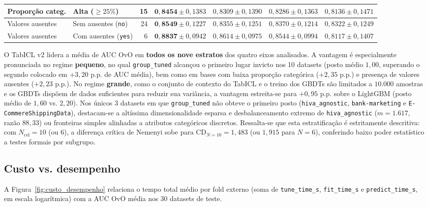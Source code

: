 \documentclass[11pt,a4paper]{article}
\begin{document}
\begin{table}[htbp]
{\begin{tabular}{@{}llrrrrr@{}}
        Proporção categ. & Alta ($\ge 25\%$) & 15 & $\mathbf{0{,}8454} \pm 0{,}1383$ & $0{,}8309 \pm 0{,}1390$ & $0{,}8286 \pm 0{,}1363$ & $0{,}8136 \pm 0{,}1471$ \\
        \midrule
        Valores ausentes & Sem ausentes (\texttt{no}) & 24 & $\mathbf{0{,}8549} \pm 0{,}1227$ & $0{,}8355 \pm 0{,}1251$ & $0{,}8370 \pm 0{,}1214$ & $0{,}8322 \pm 0{,}1249$ \\
        Valores ausentes & Com ausentes (\texttt{yes}) & 6 & $\mathbf{0{,}8837} \pm 0{,}0942$ & $0{,}8614 \pm 0{,}0975$ & $0{,}8544 \pm 0{,}0994$ & $0{,}8117 \pm 0{,}1407$ \\
        \bottomrule
    \end{tabular}
    }%
\end{table}

O TabICL v2 lidera a média de AUC OvO em \textbf{todos os nove estratos} dos quatro eixos analisados. A vantagem é especialmente pronunciada no regime \textbf{pequeno}, no qual \texttt{group\_tuned} alcançou o primeiro lugar invicto nos 10 datasets (posto médio $1{,}00$, superando o segundo colocado em $+3{,}20\text{ p.p.}$ de AUC média), bem como em bases com baixa proporção categórica ($+2{,}35\text{ p.p.}$) e presença de valores ausentes ($+2{,}23\text{ p.p.}$). No regime \textbf{grande}, como o conjunto de contexto do TabICL e o treino dos GBDTs são limitados a $10.000$ amostras e os GBDTs dispõem de dados suficientes para reduzir sua variância, a vantagem estreita-se para $+0{,}95\text{ p.p.}$ sobre o LightGBM (posto médio de $1{,}60$ vs. $2{,}20$). Nos únicos 3 datasets em que \texttt{group\_tuned} não obteve o primeiro posto (\texttt{hiva\_agnostic}, \texttt{bank-marketing} e \texttt{E-CommereShippingData}), destacam-se a altíssima dimensionalidade esparsa e desbalanceamento extremo de \texttt{hiva\_agnostic} ($m = 1.617$, razão $88{,}33$) ou fronteiras simples alinhadas a atributos categóricos discretos. Ressalta-se que esta estratificação é estritamente descritiva: com $N_{\text{cel}} = 10$ (ou $6$), a diferença crítica de Nemenyi sobe para $\mathrm{CD}_{N=10} = 1{,}483$ (ou $1{,}915$ para $N=6$), conferindo baixo poder estatístico a testes formais por subgrupo.

\subsection{Custo vs. desempenho}
\label{sec:custo_desempenho}

A Figura~\ref{fig:custo_desempenho} relaciona o tempo total médio por fold externo (soma de \texttt{tune\_time\_s}, \texttt{fit\_time\_s} e \texttt{predict\_time\_s}, em escala logarítmica) com a AUC OvO média nos 30 datasets de teste.
\end{document}
